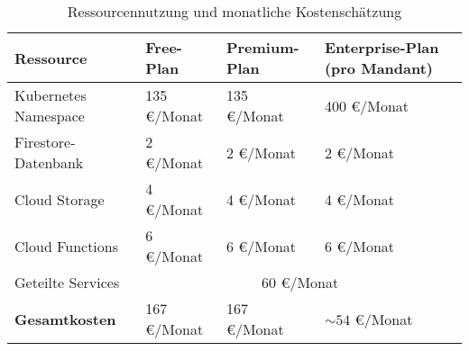 \begin{table}[h!]
	\centering
	\caption{Ressourcennutzung und monatliche Kostenschätzung}
	{
		\begin{tabularx}{\textwidth}{|l|X|X|X|}
			\hline
			\textbf{Ressource}    & \textbf{Free-Plan}              & \textbf{Premium-Plan} & \textbf{Enterprise-Plan (pro Mandant)} \\ \hline
			Kubernetes Namespace  & 135 €/Monat                     & 135 €/Monat           & 400 €/Monat                            \\ \hline
			Firestore-Datenbank   & 2 €/Monat                       & 2 €/Monat             & 2 €/Monat                              \\ \hline
			Cloud Storage         & 4 €/Monat                       & 4 €/Monat             & 4 €/Monat                              \\ \hline
			Cloud Functions       & 6 €/Monat                       & 6 €/Monat             & 6 €/Monat                              \\ \hline
			Geteilte Services     & \multicolumn{3}{c|}{60 €/Monat}                                                                  \\ \hline
			\textbf{Gesamtkosten} & 167 €/Monat                     & 167 €/Monat           & $\sim 54$ €/Monat                      \\ \hline
		\end{tabularx}}
	\label{tab:costmodel}
\end{table}

